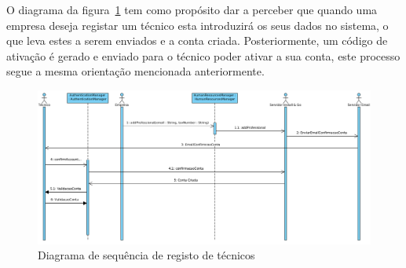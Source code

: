 O diagrama da figura~\ref{fig:45} tem como propósito dar a perceber que quando uma empresa deseja registar um técnico esta introduzirá os seus dados no sistema, o que leva estes a serem enviados e a conta criada. Posteriormente, um código de ativação é gerado e enviado para o técnico poder ativar a sua conta, este processo segue a mesma orientação mencionada anteriormente.

\begin{figure}[htb]
  \centering
  \includegraphics[width=\textwidth]{images/diagramas/sequencia/registo_tecnico.png}
  \caption{Diagrama de sequência de registo de técnicos}
  \label{fig:45}
\end{figure}